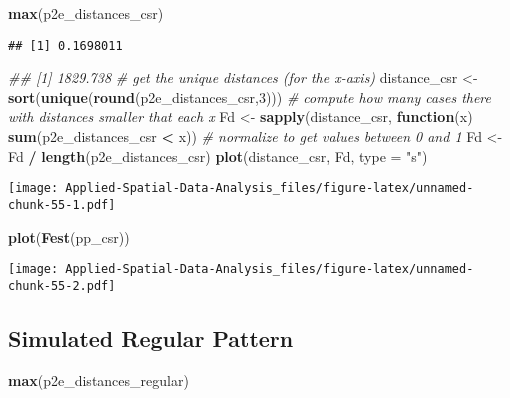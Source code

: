 \documentclass[
]{book}
\newenvironment{Shaded}{\begin{snugshade}}{\end{snugshade}}
\newcommand{\CommentTok}[1]{\textcolor[rgb]{0.56,0.35,0.01}{\textit{#1}}}
\newcommand{\ControlFlowTok}[1]{\textcolor[rgb]{0.13,0.29,0.53}{\textbf{#1}}}
\newcommand{\DataTypeTok}[1]{\textcolor[rgb]{0.13,0.29,0.53}{#1}}
\newcommand{\DecValTok}[1]{\textcolor[rgb]{0.00,0.00,0.81}{#1}}
\newcommand{\KeywordTok}[1]{\textcolor[rgb]{0.13,0.29,0.53}{\textbf{#1}}}
\newcommand{\NormalTok}[1]{#1}
\newcommand{\OperatorTok}[1]{\textcolor[rgb]{0.81,0.36,0.00}{\textbf{#1}}}
\newcommand{\StringTok}[1]{\textcolor[rgb]{0.31,0.60,0.02}{#1}}
\begin{document}
\begin{Shaded}
\begin{Highlighting}[]
\KeywordTok{max}\NormalTok{(p2e_distances_csr)}
\end{Highlighting}
\end{Shaded}

\begin{verbatim}
## [1] 0.1698011
\end{verbatim}

\begin{Shaded}
\begin{Highlighting}[]
\CommentTok{## [1] 1829.738}
\CommentTok{# get the unique distances (for the x-axis)}
\NormalTok{distance_csr <-}\StringTok{ }\KeywordTok{sort}\NormalTok{(}\KeywordTok{unique}\NormalTok{(}\KeywordTok{round}\NormalTok{(p2e_distances_csr,}\DecValTok{3}\NormalTok{)))}
\CommentTok{# compute how many cases there with distances smaller that each x}
\NormalTok{Fd <-}\StringTok{ }\KeywordTok{sapply}\NormalTok{(distance_csr, }\ControlFlowTok{function}\NormalTok{(x) }\KeywordTok{sum}\NormalTok{(p2e_distances_csr }\OperatorTok{<}\StringTok{ }\NormalTok{x))}
\CommentTok{# normalize to get values between 0 and 1}
\NormalTok{Fd <-}\StringTok{ }\NormalTok{Fd }\OperatorTok{/}\StringTok{ }\KeywordTok{length}\NormalTok{(p2e_distances_csr)}
\KeywordTok{plot}\NormalTok{(distance_csr, Fd, }\DataTypeTok{type =} \StringTok{"s"}\NormalTok{)}
\end{Highlighting}
\end{Shaded}

\texttt{[image: Applied-Spatial-Data-Analysis\_files/figure-latex/unnamed-chunk-55-1.pdf]}

\begin{Shaded}
\begin{Highlighting}[]
\KeywordTok{plot}\NormalTok{(}\KeywordTok{Fest}\NormalTok{(pp_csr))}
\end{Highlighting}
\end{Shaded}

\texttt{[image: Applied-Spatial-Data-Analysis\_files/figure-latex/unnamed-chunk-55-2.pdf]}

\hypertarget{simulated-regular-pattern-3}{%
\subsection{Simulated Regular Pattern}\label{simulated-regular-pattern-3}}

\begin{Shaded}
\begin{Highlighting}[]
\KeywordTok{max}\NormalTok{(p2e_distances_regular)}
\end{Highlighting}
\end{Shaded}
\end{document}
